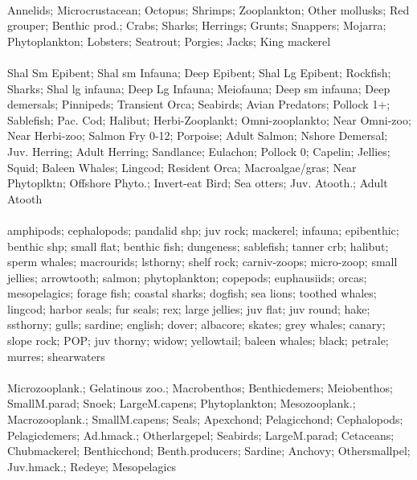 \fullhline
\hline
{} \\
\hline
Annelids; Microcrustacean; Octopus; Shrimps; Zooplankton; Other mollusks; Red grouper; Benthic prod.; Crabs; Sharks; Herrings; Grunts; Snappers; Mojarra; Phytoplankton; Lobsters; Seatrout; Porgies; Jacks; King mackerel\\
\fullhline
\hline
{} \\
\hline
Shal Sm Epibent; Shal sm Infauna; Deep  Epibent; Shal Lg Epibent; Rockfish; Sharks; Shal lg infauna; Deep Lg Infauna; Meiofauna; Deep sm infauna; Deep demersals; Pinnipeds; Transient Orca; Seabirds; Avian Predators; Pollock 1+; Sablefish; Pac. Cod; Halibut; Herbi-Zooplankt; Omni-zooplankto; Near Omni-zoo; Near Herbi-zoo; Salmon Fry 0-12; Porpoise; Adult Salmon; Nshore Demersal; Juv.  Herring; Adult Herring; Sandlance; Eulachon; Pollock 0; Capelin; Jellies; Squid; Baleen Whales; Lingcod; Resident Orca; Macroalgae/gras; Near Phytoplktn; Offshore Phyto.; Invert-eat Bird; Sea otters; Juv. Atooth.; Adult Atooth\\
\fullhline
\hline
{} \\
\hline
amphipods; cephalopods; pandalid shp; juv rock; mackerel; infauna; epibenthic; benthic shp; small flat; benthic fish; dungeness; sablefish; tanner crb; halibut; sperm whales; macrourids; lsthorny; shelf rock; carniv-zoops; micro-zoop; small jellies; arrowtooth; salmon; phytoplankton; copepods; euphausiids; orcas; mesopelagics; forage fish; coastal sharks; dogfish; sea lions; toothed whales; lingcod; harbor seals; fur seals; rex; large jellies; juv flat; juv round; hake; ssthorny; gulls; sardine; english; dover; albacore; skates; grey whales; canary; slope rock; POP; juv thorny; widow; yellowtail; baleen whales; black; petrale; murres; shearwaters\\
\fullhline
\hline
{} \\
\hline
Microzooplank.; Gelatinous zoo.; Macrobenthos; Benthicdemers; Meiobenthos; SmallM.parad; Snoek; LargeM.capens; Phytoplankton; Mesozooplank.; Macrozooplank.; SmallM.capens; Seals; Apexchond; Pelagicchond; Cephalopods; Pelagicdemers; Ad.hmack.; Otherlargepel; Seabirds; LargeM.parad; Cetaceans; Chubmackerel; Benthicchond; Benth.producers; Sardine; Anchovy; Othersmallpel; Juv.hmack.; Redeye; Mesopelagics\\
